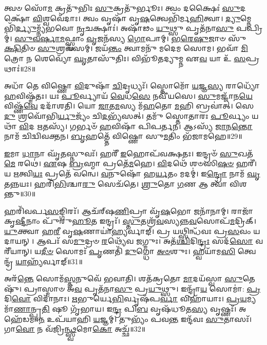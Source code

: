 𑌤𑍍𑌵𑍞 𑌸𑍋᳴\-\ul{𑌮} 𑌕𑍍𑌰𑌤𑍁᳴𑌭𑌿𑌃 \ul{𑌸𑍁}\-𑌕𑍍𑌰𑌤𑍁᳴𑌰𑍍𑌭𑍂𑌃।
𑌤𑍍𑌵𑌂 𑌦𑌕𑍍𑌷𑍈𑌃॑ \ul{𑌸𑍁}\-𑌦𑌕𑍍𑌷𑍋᳴ \ul{𑌵𑌿}\-𑌶𑍍𑌵𑌵𑍇᳴𑌦𑌾𑌃।
𑌤𑍍𑌵𑌂 𑌵𑍃𑌷𑌾᳴ 𑌵𑍃\-\ul{𑌷}\-𑌤𑍍𑌵𑍇𑌭𑌿᳴𑌰𑍍𑌮\-\ul{𑌹𑌿}\-𑌤𑍍𑌵𑌾।
\-\ul{𑌦𑍍𑌯𑍁}\-𑌮𑍍𑌨𑍇𑌭𑌿᳴\-\ul{𑌰𑍍𑌦𑍍𑌯𑍁}\-𑌮𑍍𑌨𑍍𑌯᳴𑌭𑌵𑍋 \ul{𑌨𑍃}\-𑌚𑌕𑍍𑌷𑌾𑌃॑।
𑌅𑌷𑌾᳴𑌢𑌂 \ul{𑌯𑍁}\-𑌥𑍍𑌸𑍁 𑌪𑍃𑌤᳴𑌨𑌾\-\ul{𑌸𑍁} 𑌪𑌪𑍍𑌰𑌿𑌮𑍍॑।
\-\ul{𑌸𑍁}\-\-\ul{𑌵}\-\-\ul{𑌰𑍍}\-𑌷𑌾\-\ul{𑌮}\-𑌫𑍍𑌸𑍍𑌵𑌾𑌂 \ul{𑌵𑍃}\-𑌜𑌨᳴𑌸𑍍𑌯 \ul{𑌗𑍋}\-𑌪𑌾𑌮𑍍।
\-\ul{𑌭}\-\-\ul{𑌰𑍇}\-\-\ul{𑌷𑍁}\-𑌜𑌾𑍞 𑌸𑍁᳴\-\ul{𑌕𑍍𑌷𑌿}\-𑌤𑌿𑍞 \ul{𑌸𑍁}\-𑌶𑍍𑌰𑌵᳴𑌸𑌮𑍍।
𑌜𑌯᳴\-\ul{𑌨𑍍𑌤𑌂} 𑌤𑍍𑌵𑌾𑌮𑌨𑍁᳴ 𑌮𑌦𑍇𑌮 𑌸𑍋𑌮।
𑌭𑌵𑌾᳴ \ul{𑌮𑌿}\-𑌤𑍍𑌰𑍋 𑌨 𑌶𑍇𑌵𑍍𑌯𑍋᳴ \ul{𑌘𑍃}\-𑌤𑌾𑌸𑍁᳴𑌤𑌿𑌃।
𑌵𑌿𑌭𑍂᳴𑌤𑌦𑍍𑌯𑍁𑌮𑍍𑌨 𑌏\-\ul{𑌵} 𑌯𑌾 𑌉᳴ \ul{𑌸}\-𑌪𑍍𑌰𑌥𑌾𑌃॑॥28॥

𑌅𑌧𑌾᳴ 𑌤𑍇 𑌵𑌿𑌷𑍍𑌣𑍋 \ul{𑌵𑌿}\-𑌦𑍁𑌷𑌾᳴ \ul{𑌚𑌿}\-𑌦𑍃𑌧𑍍𑌯𑌃᳴।
𑌸𑍍𑌤𑍋𑌮𑍋᳴ \ul{𑌯}\-𑌜𑍍𑌞\-\ul{𑌸𑍍𑌯} 𑌰𑌾𑌧𑍍𑌯𑍋᳴ \ul{𑌹}\-𑌵𑌿𑌷𑍍𑌮᳴𑌤𑌃।
𑌯𑌃 \ul{𑌪𑍂}\-𑌰𑍍𑌵𑍍𑌯𑌾𑌯᳴ \ul{𑌵𑍇}\-𑌧\-\ul{𑌸𑍇} 𑌨𑌵𑍀᳴𑌯𑌸𑍇।
\-\ul{𑌸𑍁}\-𑌮𑌜𑍍𑌜𑌾᳴𑌨\-\ul{𑌯𑍇} 𑌵𑌿𑌷𑍍𑌣᳴\-\ul{𑌵𑍇} 𑌦𑌦𑌾᳴𑌶𑌤𑌿।
𑌯𑍋 \ul{𑌜𑌾}\-𑌤\-\ul{𑌮}\-𑌸𑍍𑌯 𑌮᳴\-\ul{𑌹}\-𑌤𑍋 \ul{𑌮}\-𑌹𑌿 𑌬𑍍𑌰𑌵𑌾॑𑌤𑍍।
𑌸𑍇\-\ul{𑌦𑍁} 𑌶𑍍𑌰𑌵𑍋᳴𑌭𑌿\-\ul{𑌰𑍍𑌯𑍁}\-𑌜𑍍𑌯𑌂᳴         𑌚𑌿\-\ul{𑌦}\-𑌭𑍍𑌯᳴𑌸𑌤𑍍।
𑌤𑌮𑍁᳴ 𑌸𑍍𑌤𑍋𑌤𑌾𑌰𑌃 \ul{𑌪𑍂}\-𑌰𑍍𑌵𑍍𑌯𑌂 𑌯𑌥𑌾᳴ \ul{𑌵𑌿}\-𑌦 \ul{𑌋}\-𑌤𑌸𑍍𑌯᳴।
𑌗𑌰𑍍𑌭𑍞᳴ \ul{𑌹}\-𑌵𑌿𑌷𑌾᳴ 𑌪𑌿𑌪𑌰𑍍𑌤𑌨।
𑌆𑌽𑌸𑍍𑌯᳴ \ul{𑌜𑌾}\-𑌨\-\ul{𑌨𑍍𑌤𑍋} 𑌨𑌾𑌮᳴ 𑌚𑌿𑌦𑍍𑌵𑌿𑌵𑌕𑍍𑌤𑌨।
\-\ul{𑌬𑍃}\-𑌹𑌤𑍍𑌤𑍇᳴ 𑌵𑌿𑌷𑍍𑌣𑍋 𑌸𑍁\-\ul{𑌮}\-𑌤𑌿𑌂 𑌭᳴𑌜𑌾𑌮𑌹𑍇॥29॥

\-\ul{𑌇}\-𑌮𑌾 \ul{𑌧𑌾}\-𑌨𑌾 𑌘𑍃᳴\-\ul{𑌤}\-𑌸𑍍𑌨𑍁𑌵𑌃᳴।
𑌹𑌰𑍀᳴ \ul{𑌇}\-𑌹𑍋𑌪᳴𑌵𑌕𑍍𑌷𑌤𑌃।
𑌇𑌨𑍍𑌦𑍍𑌰𑍞᳴ \ul{𑌸𑍁}\-𑌖𑌤᳴\-\ul{𑌮𑍇} 𑌰𑌥𑍇॑।
\-\ul{𑌏}\-𑌷 \ul{𑌬𑍍𑌰}\-𑌹𑍍𑌮𑌾 𑌪𑍍𑌰𑌤𑍇᳴\-\ul{𑌮}\-𑌹𑍇।
\-\ul{𑌵𑌿}\-𑌦𑌥𑍇᳴ 𑌶𑍞𑌸𑌿\-\ul{𑌷}\-\-\ul{𑍞} 𑌹𑌰𑍀॑।
𑌯 \ul{𑌋}\-𑌤𑍍𑌵𑌿\-\ul{𑌯𑌃} 𑌪𑍍𑌰𑌤𑍇᳴ 𑌵𑌨𑍍𑌵𑍇।
\-\ul{𑌵}\-𑌨𑍁𑌷𑍋᳴ 𑌹\-\ul{𑌰𑍍𑌯}\-𑌤𑌂 𑌮𑌦𑌮𑍍॑।
𑌇\-\ul{𑌨𑍍𑌦𑍍𑌰𑍋} 𑌨𑌾𑌮᳴ \ul{𑌘𑍃}\-𑌤𑌨𑍍𑌨𑌯𑌃।
𑌹𑌰𑌿᳴\-\ul{𑌭𑌿}\-𑌶𑍍𑌚𑌾\-\ul{𑌰𑍁} 𑌸𑍇𑌚᳴𑌤𑍇।
\-\ul{𑌶𑍍𑌰𑍁}\-𑌤𑍋 \ul{𑌗}\-𑌣 𑌆 𑌤𑍍𑌵𑌾᳴ 𑌵𑌿𑌶𑌨𑍍𑌤𑍁॥30॥

𑌹𑌰𑌿᳴𑌵𑌰𑍍𑌪\-\ul{𑌸}\-𑌙𑍍𑌗𑌿𑌰𑌃᳴।
𑌆𑌚᳴𑌰𑍍‌\mbox{}𑌷\-\ul{𑌣𑌿}\-𑌪𑍍𑌰𑌾 𑌵𑍃᳴\-\ul{𑌷}\-𑌭𑍋 𑌜𑌨𑌾᳴𑌨𑌾𑌮𑍍।
𑌰𑌾𑌜𑌾᳴ 𑌕𑍃\-\ul{𑌷𑍍𑌟𑍀}\-𑌨𑌾𑌂 𑌪𑍁᳴𑌰𑍁\-\ul{𑌹𑍂}\-𑌤 𑌇𑌨𑍍𑌦𑍍𑌰𑌃᳴।
\-\ul{𑌸𑍍𑌤𑍁}\-𑌤𑌶𑍍𑌰᳴\-\ul{𑌵}\-𑌸𑍍𑌯𑌨𑍍𑌨\-\ul{𑌵}\-𑌸𑍋𑌪᳴\-\ul{𑌮}\-𑌦𑍍𑌰𑌿𑌕𑍍।
\-\ul{𑌯𑍁}\-𑌕𑍍𑌤𑍍𑌵𑌾 𑌹\-\ul{𑌰𑍀} 𑌵𑍃\-\ul{𑌷}\-𑌣𑌾𑌯𑌾॑\-\ul{𑌹𑍍𑌯}\-𑌰𑍍𑌵𑌾𑌙𑍍।
𑌪𑍍𑌰 𑌯𑌥𑍍𑌸𑌿𑌨𑍍𑌧᳴𑌵𑌃 𑌪𑍍𑌰\-\ul{𑌸}\-𑌵𑌂 𑌯𑌦𑌾𑌯𑌨𑍍।
𑌆𑌪𑌃᳴ 𑌸\-\ul{𑌮𑍁}\-𑌦𑍍𑌰𑍞 \ul{𑌰}\-𑌥𑍍𑌯𑍇᳴𑌵 𑌜𑌗𑍍𑌮𑍁𑌃।
𑌅𑌤᳴\-\ul{𑌶𑍍𑌚𑌿}\-𑌦𑌿\-\ul{𑌨𑍍𑌦𑍍𑌰𑌃} 𑌸𑌦᳴\-\ul{𑌸𑍋} 𑌵𑌰𑍀᳴𑌯𑌾𑌨𑍍।
𑌯\-\ul{𑌦𑍀}\-\-\ul{𑍞} 𑌸𑍋𑌮𑌃᳴ \ul{𑌪𑍃}\-𑌣𑌤𑌿᳴ \ul{𑌦𑍁}\-𑌗𑍍𑌧𑍋 \ul{𑌅}\-\-\ul{𑍞}\-𑌶𑍁𑌃।
𑌹𑍍𑌵𑌯𑌾᳴𑌮\-\ul{𑌸𑌿} 𑌤𑍍𑌵𑍇𑌨𑍍𑌦𑍍𑌰᳴ \ul{𑌯𑌾}\-𑌹𑍍𑌯᳴𑌰𑍍𑌵𑌾𑌙𑍍॥31॥

𑌅𑌰᳴\-\ul{𑌨𑍍𑌤𑍇} 𑌸𑍋𑌮᳴\-\ul{𑌸𑍍𑌤}\-𑌨𑍁𑌵𑍇᳴ 𑌭𑌵𑌾𑌤𑌿।
𑌶𑌤᳴𑌕𑍍𑌰𑌤𑍋 \ul{𑌮𑌾}\-𑌦𑌯᳴𑌸𑍍𑌵𑌾 \ul{𑌸𑍁}\-𑌤𑍇𑌷𑍁᳴।
𑌪𑍍𑌰𑌾𑌸𑍍𑌮𑌾𑍞 𑌅᳴\-\ul{𑌵} 𑌪𑍃𑌤᳴𑌨𑌾\-\ul{𑌸𑍁} 𑌪𑍍𑌰\-\ul{𑌯𑍁}\-𑌥𑍍𑌸𑍁।
𑌇𑌨𑍍𑌦𑍍𑌰𑌾᳴\-\ul{𑌯} 𑌸𑍋𑌮𑌾॑: \ul{𑌪𑍍𑌰}\-𑌦𑌿\-\ul{𑌵𑍋} 𑌵𑌿𑌦𑌾᳴𑌨𑌾𑌃।
\-\ul{𑌋}\-𑌭𑍁𑌰𑍍𑌯𑍇\-\ul{𑌭𑌿}\-𑌰𑍍𑌵𑍃𑌷᳴𑌪\-\ul{𑌰𑍍𑌵𑌾} 𑌵𑌿𑌹𑌾᳴𑌯𑌾𑌃।
\-\ul{𑌪𑍍𑌰}\-\-\ul{𑌯}\-𑌮𑍍𑌯𑌮𑌾᳴\-\ul{𑌣𑌾}\-𑌨𑍍𑌪𑍍𑌰\-\ul{𑌤𑌿} 𑌷𑍂 𑌗𑍃᳴𑌭𑌾𑌯।
𑌇\-\ul{𑌨𑍍𑌦𑍍𑌰} 𑌪𑌿\-\ul{𑌬} 𑌵𑍃𑌷᳴𑌧𑍂𑌤\-\ul{𑌸𑍍𑌯} 𑌵𑍃𑌷𑍍𑌣𑌃᳴।
𑌅𑌹𑍇᳴𑌡𑌮𑌾\-\ul{𑌨} 𑌉𑌪᳴𑌯𑌾𑌹𑌿 \ul{𑌯}\-𑌜𑍍𑌞𑌮𑍍।
𑌤𑍁𑌭𑍍𑌯𑌂᳴ 𑌪𑌵\-\ul{𑌨𑍍𑌤} 𑌇𑌨𑍍𑌦᳴𑌵𑌃 \ul{𑌸𑍁}\-𑌤𑌾𑌸𑌃᳴।
𑌗𑌾\-\ul{𑌵𑍋} 𑌨 𑌵᳴𑌜𑍍𑌰𑌿\-\ul{𑌨𑍍𑌥𑍍𑌸𑍍𑌵}\-𑌮𑍋\-\ul{𑌕𑍋} 𑌅𑌚𑍍𑌛᳴॥32॥

